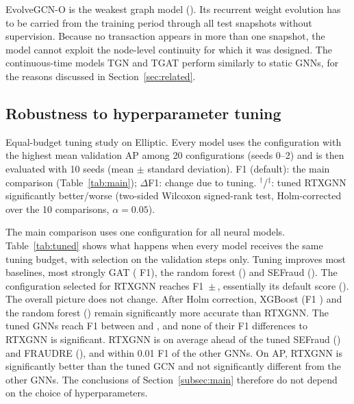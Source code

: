 EvolveGCN-O is the weakest graph model (\evolvegcnFone). Its recurrent weight evolution has to be carried from the training period through all test snapshots without supervision. Because no transaction appears in more than one snapshot, the model cannot exploit the node-level continuity for which it was designed. The continuous-time models TGN and TGAT perform similarly to static GNNs, for the reasons discussed in Section~\ref{sec:related}.


\subsection{Robustness to hyperparameter tuning}
\label{subsec:tuning}

\begin{table}[!t]
\centering
\caption{Equal-budget tuning study on Elliptic. Every model uses the configuration with the highest mean validation AP among 20 configurations (seeds 0--2) and is then evaluated with 10 seeds (mean $\pm$ standard deviation). F1 (default): the main comparison (Table~\ref{tab:main}); $\Delta$F1: change due to tuning. $^{\dagger}$/$^{\ddagger}$: tuned RTXGNN significantly better/worse (two-sided Wilcoxon signed-rank test, Holm-corrected over the 10 comparisons, $\alpha=0.05$).}
\label{tab:tuned}
\footnotesize
\begin{adjustbox}{max width=\textwidth}\end{adjustbox}
\end{table}

The main comparison uses one configuration for all neural models. Table~\ref{tab:tuned} shows what happens when every model receives the same tuning budget, with selection on the validation steps only. Tuning improves most baselines, most strongly GAT (\tungaingat{} F1), the random forest (\tungainrf) and SEFraud (\tungainsefraud). The configuration selected for RTXGNN reaches F1 \tunrtxgnnFone\,$\pm$\,\tunrtxgnnFoneSd, essentially its default score (\tungainrtxgnn). The overall picture does not change. After Holm correction, XGBoost (F1 \tunxgbFone) and the random forest (\tunrfFone) remain significantly more accurate than RTXGNN. The tuned GNNs reach F1 between \tunGnnMin{} and \tunGnnMax, and none of their F1 differences to RTXGNN is significant. RTXGNN is on average ahead of the tuned SEFraud (\tundeltasefraud) and FRAUDRE (\tundeltafraudre), and within 0.01 F1 of the other GNNs. On AP, RTXGNN is significantly better than the tuned GCN and not significantly different from the other GNNs. The conclusions of Section~\ref{subsec:main} therefore do not depend on the choice of hyperparameters.

